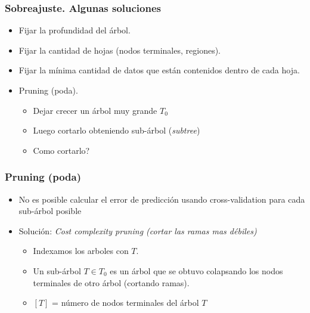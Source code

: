 \documentclass[
  shownotes,
  xcolor={svgnames},
  hyperref={colorlinks,citecolor=DarkBlue,linkcolor=andesred,urlcolor=DarkBlue}
  , aspectratio=169]{beamer}
\begin{document}
\begin{frame}[fragile]
\frametitle{Sobreajuste. Algunas soluciones}

\begin{itemize}
  \item Fijar la profundidad del árbol.
  \medskip
  \item Fijar la cantidad de hojas (nodos terminales, regiones).
  \medskip
  \item Fijar la mínima cantidad de datos que están contenidos dentro de cada hoja. 
\medskip
\item  Pruning (poda).
\medskip
  \begin{itemize}
     \item Dejar crecer un árbol muy grande $T_0$
     \medskip
     \item Luego cortarlo obteniendo sub-árbol ({\it subtree})
     \medskip
     \item Como cortarlo? 
  \end{itemize}
\end{itemize}


\end{frame}
\begin{frame}[fragile]
\frametitle{Pruning (poda)}

\begin{itemize}
\item No es posible calcular el error de predicción usando cross-validation para cada sub-árbol posible 
\medskip
\item Solución: {\it Cost complexity pruning (cortar las ramas mas débiles)}
\medskip
\begin{itemize}
    \item Indexamos los arboles con  $T$.
    \medskip
    \item Un sub-árbol $T \in T_0$ es un árbol que se obtuvo colapsando los nodos terminales de otro árbol (cortando ramas).
    \medskip
    \item  $[T]$ = número de nodos terminales del árbol  $T$
\end{itemize}
\end{itemize}
\end{frame}
\end{document}
